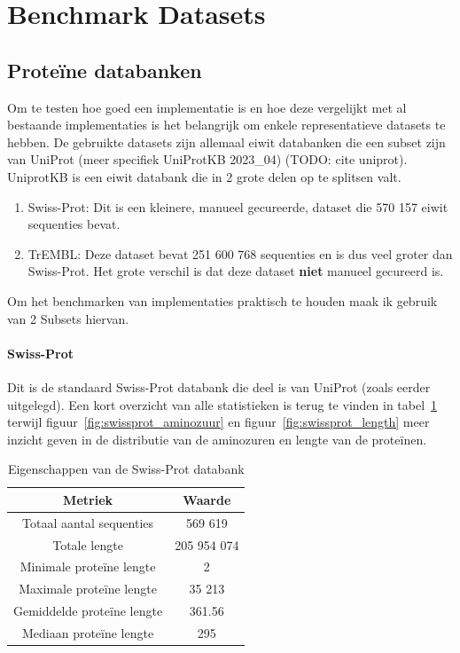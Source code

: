 \documentclass[11pt,dutch,faculty=we,layout=titlefont,underline=false,titleUppercase=true,titleUnderline=true]{ugent2016-report}
\begin{document}
    \section{Benchmark Datasets}\label{sec:datasets}

    \subsection{Proteïne databanken}\label{subsec:proteine-databanken}
    Om te testen hoe goed een implementatie is en hoe deze vergelijkt met al bestaande implementaties is het belangrijk om enkele representatieve datasets te hebben.
    De gebruikte datasets zijn allemaal eiwit databanken die een subset zijn van UniProt (meer specifiek UniProtKB 2023\_04) (TODO: cite uniprot).
    UniprotKB is een eiwit databank die in 2 grote delen op te splitsen valt.
    \begin{enumerate}
        \item Swiss-Prot: Dit is een kleinere, manueel gecureerde, dataset die 570 157 eiwit sequenties bevat.
        \item TrEMBL: Deze dataset bevat 251 600 768 sequenties en is dus veel groter dan Swiss-Prot.
        Het grote verschil is dat deze dataset \textbf{niet} manueel gecureerd is.
    \end{enumerate}

    Om het benchmarken van implementaties praktisch te houden maak ik gebruik van 2 Subsets hiervan.

    \paragraph{Swiss-Prot} Dit is de standaard Swiss-Prot databank die deel is van UniProt (zoals eerder uitgelegd).
    Een kort overzicht van alle statistieken is terug te vinden in tabel~\ref{tab:swissprot_eigenschappen} terwijl figuur~\ref{fig:swissprot_aminozuur} en figuur~\ref{fig:swissprot_length} meer inzicht geven in de distributie van de aminozuren en lengte van de proteïnen.

    \begin{table}[h!]
        \centering
        \begin{tabular}{c c}
            Metriek                    & Waarde      \\
            \hline\hline
            Totaal aantal sequenties   & 569 619     \\
            Totale lengte              & 205 954 074 \\
            Minimale proteïne lengte   & 2           \\
            Maximale proteïne lengte   & 35 213      \\
            Gemiddelde proteïne lengte & 361.56      \\
            Mediaan proteïne lengte    & 295         \\
            \hline
        \end{tabular}
        \caption{Eigenschappen van de Swiss-Prot databank}
        \label{tab:swissprot_eigenschappen}
    \end{table}
\end{document}

